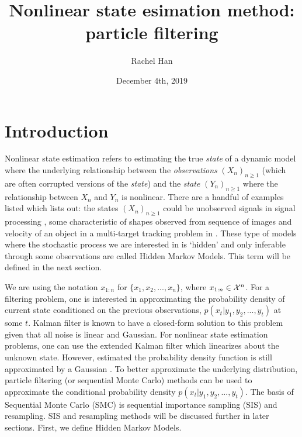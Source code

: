 \documentclass[10pt]{article}
\title{Nonlinear state esimation method: particle filtering} %
\author{Rachel Han} %
\date{December 4th, 2019} %
\theoremstyle{definition}
\numberwithin{equation}{section}
\begin{document}
\maketitle

%


\section{Introduction}
Nonlinear state estimation refers to estimating the true \textit{state} of a dynamic model where the underlying relationship between the \textit{observations} $(X_n)_{n \geq 1}$ (which are often corrupted versions of the \textit{state}) and the \textit{state} $(Y_n)_{n \geq 1}$ where the relationship between $X_n$ and $Y_n$ is nonlinear. There are a handful of examples listed which \cite{liu1998sequential} lists out: the states $(X_n)_{n \geq 1}$ could be unobserved signals in signal processing \cite{liu1995blind}, some characteristic of shapes observed from sequence of images \cite{blake1998statistical} and velocity of an object in a multi-target tracking problem in \cite{gordon1993novel}. These type of models where the stochastic process we are interested in is `hidden' and only inferable through some observations are called Hidden Markov Models. This term will be defined in the next section. 

We are using the notation $x_{1:n}$ for $\{ x_1, x_2, ..., x_n \}$, where $x_{1:n} \in \mathcal{X}^n$.
For a filtering problem, one is interested in approximating the probability density of current state conditioned on the previous observations, $p(x_t|y_1, y_2, ..., y_t)$ at some $t$. Kalman filter is known to have a closed-form solution to this problem given that all noise is linear and Gaussian. For nonlinear state estimation problems, one can use the extended Kalman filter which linearizes about the unknown state. However, estimated the probability density function is still approximated by a Gaussian \cite{gordon1993novel}. To better approximate the underlying distribution, particle filtering (or sequential Monte Carlo) methods can be used to approximate the conditional probability density $p(x_t|y_1, y_2, ..., y_t)$. The basis of Sequential Monte Carlo (SMC) is sequential importance sampling (SIS) and resampling. SIS and resampling methods will be discussed further in later sections. First, we define Hidden Markov Models.
\end{document}
